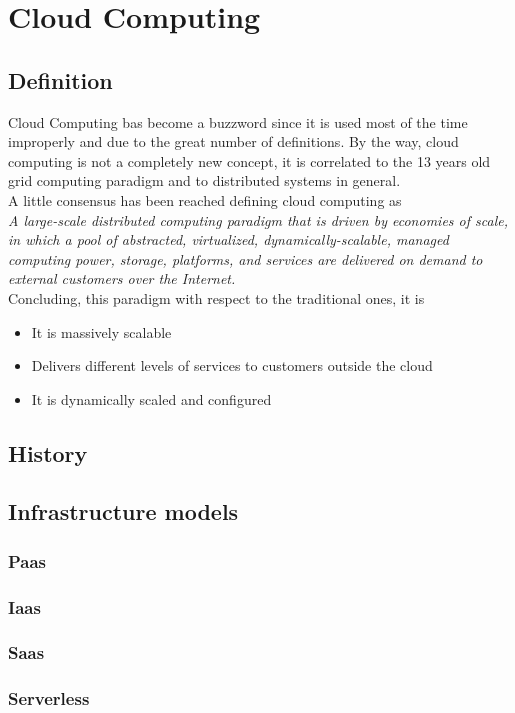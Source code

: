 \chapter{Cloud Computing}
\section{Definition}
Cloud Computing bas become a buzzword since it is used most of the time improperly and due to the great number of definitions. By the way, cloud computing is not a completely new concept, it is correlated to the 13 years old grid computing paradigm and to distributed systems in general.\cite{foster}\\
A little consensus has been reached defining cloud computing as\\
\textit{A large-scale distributed computing paradigm that is driven by economies of scale, in which a pool of abstracted, virtualized, dynamically-scalable, managed computing power, storage, platforms, and services are delivered on demand to external customers over the Internet.}\\
Concluding, this paradigm with respect to the traditional ones, it is
\begin{itemize}
    \item It is massively scalable
    \item Delivers different levels of services to customers outside the cloud
    \item It is dynamically scaled and configured
\end{itemize}
\cite{foster}
\section{History}

\section{Infrastructure models}
\subsection{Paas}
\subsection{Iaas}
\subsection{Saas}
\subsection{Serverless}
